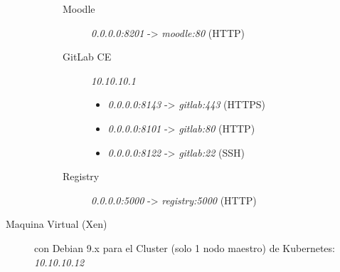 \begin{description}
\begin{description}
\begin{description}
        	\item[Moodle] \textit{0.0.0.0:8201} -> \textit{moodle:80} (HTTP)
        	\item[GitLab CE] \textit{10.10.10.1}
            \begin{itemize}
            	\item \textit{0.0.0.0:8143} -> \textit{gitlab:443} (HTTPS)
            	\item \textit{0.0.0.0:8101} -> \textit{gitlab:80} (HTTP)
            	\item \textit{0.0.0.0:8122} -> \textit{gitlab:22} (SSH)
            \end{itemize}
            \item[Registry] \textit{0.0.0.0:5000} -> \textit{registry:5000} (HTTP)
        \end{description}
    \end{description}
    \item[Maquina Virtual (Xen)] con Debian 9.x para el Cluster (solo 1 nodo maestro) de Kubernetes: \textit{10.10.10.12}
\end{description}


